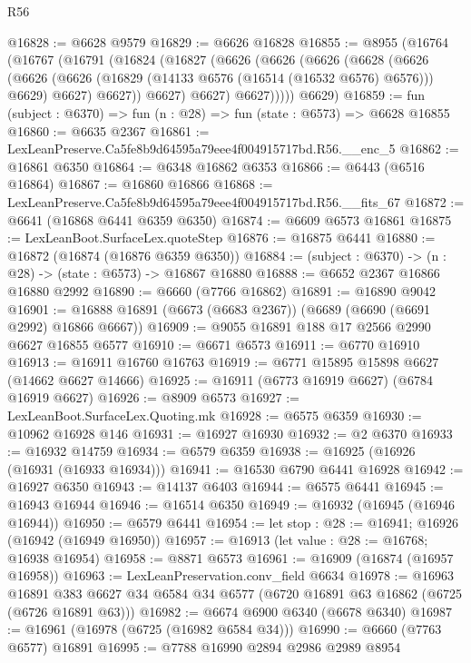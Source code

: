 \begin{lexlean}{R56}
\begin{coremodule}
@16828 := @6628 @9579
@16829 := @6626 @16828
@16855 := @8955
    (@16764
      (@16767
        (@16791
          (@16824
            (@16827
              (@6626
                (@6626
                  (@6626
                    (@6628
                      (@6626
                        (@6626
                          (@6626 (@16829 (@14133 @6576 (@16514 (@16532 @6576) @6576))) @6629)
                          @6627)
                        @6627))
                    @6627)
                  @6627)
                @6627)))))
      @6629)
@16859 := fun (subject : @6370) => fun (n : @28) => fun (state : @6573) => @6628 @16855
@16860 := @6635 @2367
@16861 := LexLeanPreserve.Ca5fe8b9d64595a79eee4f004915717bd.R56.__enc_5
@16862 := @16861 @6350
@16864 := @6348 @16862 @6353
@16866 := @6443 (@6516 @16864)
@16867 := @16860 @16866
@16868 := LexLeanPreserve.Ca5fe8b9d64595a79eee4f004915717bd.R56.__fits_67
@16872 := @6641 (@16868 @6441 @6359 @6350)
@16874 := @6609 @6573 @16861
@16875 := LexLeanBoot.SurfaceLex.quoteStep
@16876 := @16875 @6441
@16880 := @16872 (@16874 (@16876 @6359 @6350))
@16884 := (subject : @6370) -> (n : @28) -> (state : @6573) -> @16867 @16880
@16888 := @6652 @2367 @16866 @16880 @2992
@16890 := @6660 (@7766 @16862)
@16891 := @16890 @9042
@16901 := @16888 @16891 (@6673 (@6683 @2367)) (@6689 (@6690 (@6691 @2992) @16866 @6667))
@16909 := @9055 @16891 @188 @17 @2566 @2990 @6627 @16855 @6577
@16910 := @6671 @6573
@16911 := @6770 @16910
@16913 := @16911 @16760 @16763
@16919 := @6771 @15895 @15898 @6627 (@14662 @6627 @14666)
@16925 := @16911 (@6773 @16919 @6627) (@6784 @16919 @6627)
@16926 := @8909 @6573
@16927 := LexLeanBoot.SurfaceLex.Quoting.mk
@16928 := @6575 @6359
@16930 := @10962 @16928 @146
@16931 := @16927 @16930
@16932 := @2 @6370
@16933 := @16932 @14759
@16934 := @6579 @6359
@16938 := @16925 (@16926 (@16931 (@16933 @16934)))
@16941 := @16530 @6790 @6441 @16928
@16942 := @16927 @6350
@16943 := @14137 @6403
@16944 := @6575 @6441
@16945 := @16943 @16944
@16946 := @16514 @6350
@16949 := @16932 (@16945 (@16946 @16944))
@16950 := @6579 @6441
@16954 := let stop : @28 := @16941; @16926 (@16942 (@16949 @16950))
@16957 := @16913 (let value : @28 := @16768; @16938 @16954)
@16958 := @8871 @6573
@16961 := @16909 (@16874 (@16957 @16958))
@16963 := LexLeanPreservation.conv_field @6634
@16978 := @16963
    @16891
    @383
    @6627
    @34
    @6584
    @34
    @6577
    (@6720 @16891 @63 @16862 (@6725 (@6726 @16891 @63)))
@16982 := @6674 @6900 @6340 (@6678 @6340)
@16987 := @16961 (@16978 (@6725 (@16982 @6584 @34)))
@16990 := @6660 (@7763 @6577) @16891
@16995 := @7788 @16990 @2894 @2986 @2989 @8954

\end{coremodule}
\end{lexlean}

